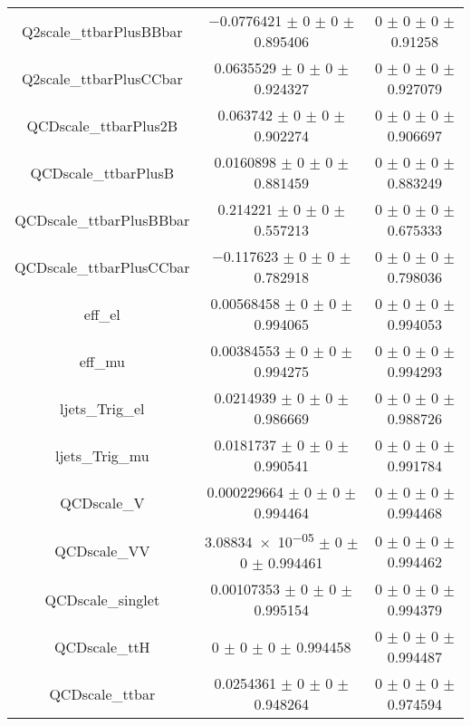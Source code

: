 \begin{table}
\begin{tabular}{ccc}
Q2scale\_ttbarPlusBBbar & \num{-0.0776421} $\pm$ \num{0} $\pm$ \num{0} $\pm$ \num{0.895406} & \num{0} $\pm$ \num{0} $\pm$ \num{0} $\pm$ \num{0.91258}\\
Q2scale\_ttbarPlusCCbar & \num{0.0635529} $\pm$ \num{0} $\pm$ \num{0} $\pm$ \num{0.924327} & \num{0} $\pm$ \num{0} $\pm$ \num{0} $\pm$ \num{0.927079}\\
QCDscale\_ttbarPlus2B & \num{0.063742} $\pm$ \num{0} $\pm$ \num{0} $\pm$ \num{0.902274} & \num{0} $\pm$ \num{0} $\pm$ \num{0} $\pm$ \num{0.906697}\\
QCDscale\_ttbarPlusB & \num{0.0160898} $\pm$ \num{0} $\pm$ \num{0} $\pm$ \num{0.881459} & \num{0} $\pm$ \num{0} $\pm$ \num{0} $\pm$ \num{0.883249}\\
QCDscale\_ttbarPlusBBbar & \num{0.214221} $\pm$ \num{0} $\pm$ \num{0} $\pm$ \num{0.557213} & \num{0} $\pm$ \num{0} $\pm$ \num{0} $\pm$ \num{0.675333}\\
QCDscale\_ttbarPlusCCbar & \num{-0.117623} $\pm$ \num{0} $\pm$ \num{0} $\pm$ \num{0.782918} & \num{0} $\pm$ \num{0} $\pm$ \num{0} $\pm$ \num{0.798036}\\
eff\_el & \num{0.00568458} $\pm$ \num{0} $\pm$ \num{0} $\pm$ \num{0.994065} & \num{0} $\pm$ \num{0} $\pm$ \num{0} $\pm$ \num{0.994053}\\
eff\_mu & \num{0.00384553} $\pm$ \num{0} $\pm$ \num{0} $\pm$ \num{0.994275} & \num{0} $\pm$ \num{0} $\pm$ \num{0} $\pm$ \num{0.994293}\\
ljets\_Trig\_el & \num{0.0214939} $\pm$ \num{0} $\pm$ \num{0} $\pm$ \num{0.986669} & \num{0} $\pm$ \num{0} $\pm$ \num{0} $\pm$ \num{0.988726}\\
ljets\_Trig\_mu & \num{0.0181737} $\pm$ \num{0} $\pm$ \num{0} $\pm$ \num{0.990541} & \num{0} $\pm$ \num{0} $\pm$ \num{0} $\pm$ \num{0.991784}\\
QCDscale\_V & \num{0.000229664} $\pm$ \num{0} $\pm$ \num{0} $\pm$ \num{0.994464} & \num{0} $\pm$ \num{0} $\pm$ \num{0} $\pm$ \num{0.994468}\\
QCDscale\_VV & \num{3.08834e-05} $\pm$ \num{0} $\pm$ \num{0} $\pm$ \num{0.994461} & \num{0} $\pm$ \num{0} $\pm$ \num{0} $\pm$ \num{0.994462}\\
QCDscale\_singlet & \num{0.00107353} $\pm$ \num{0} $\pm$ \num{0} $\pm$ \num{0.995154} & \num{0} $\pm$ \num{0} $\pm$ \num{0} $\pm$ \num{0.994379}\\
QCDscale\_ttH & \num{0} $\pm$ \num{0} $\pm$ \num{0} $\pm$ \num{0.994458} & \num{0} $\pm$ \num{0} $\pm$ \num{0} $\pm$ \num{0.994487}\\
QCDscale\_ttbar & \num{0.0254361} $\pm$ \num{0} $\pm$ \num{0} $\pm$ \num{0.948264} & \num{0} $\pm$ \num{0} $\pm$ \num{0} $\pm$ \num{0.974594}\\

\end{tabular}
\end{table}
